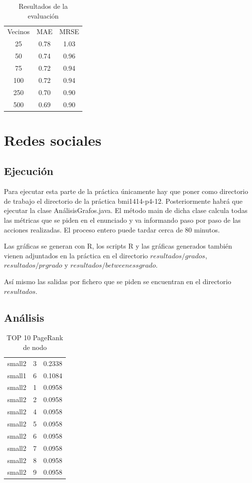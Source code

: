\documentclass[palatino]{apuntes}
\begin{document}
   
   	\begin{table}[h!]
   		\centering
		\begin{tabular}{ccc}
			Vecinos  &  MAE &  MRSE \\
			25 & 0.78 & 1.03 \\
			50 & 0.74 & 0.96 \\
			75 & 0.72 & 0.94 \\
			100 & 0.72 & 0.94 \\
			250 & 0.70 & 0.90 \\
			500 & 0.69 & 0.90 
		\end{tabular}
		\caption{Resultados de la evaluación}
	\end{table}





\chapter{Redes sociales}

\section{Ejecución}

Para ejecutar esta parte de la práctica únicamente hay que poner como directorio de trabajo el directorio de la práctica bmi1414-p4-12. Posteriormente habrá que ejecutar la clase AnálisisGrafos.java. El método main de dicha clase calcula todas las métricas que se piden en el enunciado y va informando paso por paso de las acciones realizadas. El proceso entero puede tardar cerca de 80 minutos.

Las gráficas se generan con R, los scripts R y las gráficas generados también vienen adjuntados en la práctica en el directorio $resultados/grados$, $resultados/prgrado$ y $resultados/betweenessgrado$.

Así mismo las salidas por fichero que se piden se encuentran en el directorio $resultados$.


\section{Análisis}


\begin{table}[h!]
\caption{TOP 10 PageRank de nodo}
\centering
\begin{tabular}{ccc}
small2&3&0.2338\\
small1&6&0.1084\\
small2&1&0.0958\\
small2&2&0.0958\\
small2&4&0.0958\\
small2&5&0.0958\\
small2&6&0.0958\\
small2&7&0.0958\\
small2&8&0.0958\\
small2&9&0.0958\\
\end{tabular}
\end{table}
\end{document}
